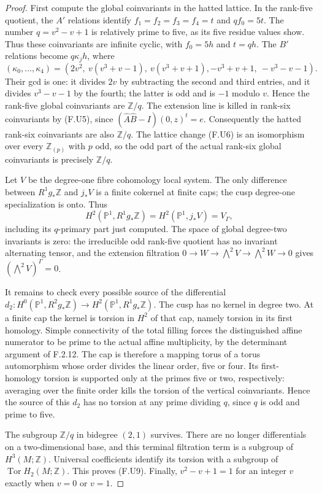\begin{proof}
First compute the global coinvariants in the hatted lattice.
In the rank-five quotient, the $A'$ relations identify
$f_1=f_2=f_3=f_4=t$ and $qf_0=5t$.
The number $q=v^2-v+1$ is relatively prime to five, as its
five residue values show.  Thus these coinvariants are
infinite cyclic, with $f_0=5h$ and $t=qh$.
The $B'$ relations become $q\kappa_j h$, where
\[
 (\kappa_0,\ldots,\kappa_4)=
 (2v^2,\ v(v^3+v-1),\ v(v^3+v+1),
       -v^3+v+1,\ -v^3-v-1).
 \tag{F.U10}
\]
Their gcd is one: it divides $2v$ by subtracting the second
and third entries, and it divides $v^3-v-1$ by the fourth;
the latter is odd and is $-1$ modulo $v$.
Hence the rank-five global coinvariants are $\mathbb Z/q$.
The extension line is killed in rank-six coinvariants by
(F.U5), since
$(\widehat A\widehat B-I)(0,z)^t=e$.
Consequently the hatted rank-six coinvariants are also
$\mathbb Z/q$.  The lattice change (F.U6) is an isomorphism
over every $\mathbb Z_{(p)}$ with $p$ odd, so the odd part of
the actual rank-six global coinvariants is precisely
$\mathbb Z/q$.

Let $V$ be the degree-one fibre cohomology local system.
The only difference between $R^1g_*\mathbb Z$ and $j_*V$
is a finite cokernel at finite caps; the cusp degree-one
specialization is onto.  Thus
\[
 H^2(\mathbb P^1,R^1g_*\mathbb Z)
 =H^2(\mathbb P^1,j_*V)=V_\Gamma,
\]
including its $q$-primary part just computed.  The space of
global degree-two invariants is zero: the irreducible odd
rank-five quotient has no invariant alternating tensor,
and the extension filtration
$0\to W\to\bigwedge^2V\to\bigwedge^2W\to0$
gives $(\bigwedge^2V)^\Gamma=0$.

It remains to check every possible source of the differential
$d_2:H^0(\mathbb P^1,R^2g_*\mathbb Z)
\to H^2(\mathbb P^1,R^1g_*\mathbb Z)$.
The cusp has no kernel in degree two.  At a finite cap the
kernel is torsion in $H^2$ of that cap, namely torsion in its
first homology.  Simple connectivity of the total filling
forces the distinguished affine numerator to be prime to the
actual affine multiplicity, by the determinant argument of
F.2.12.  The cap is therefore a mapping torus of a torus
automorphism whose order divides the linear order, five or
four.  Its first-homology torsion is supported only at the
primes five or two, respectively: averaging over the finite
order kills the torsion of the vertical coinvariants.
Hence the source of this $d_2$ has no torsion at any prime
dividing $q$, since $q$ is odd and prime to five.

The subgroup $\mathbb Z/q$ in bidegree $(2,1)$ survives.
There are no longer differentials on a two-dimensional base,
and this terminal filtration term is a subgroup of
$H^3(M;\mathbb Z)$.  Universal coefficients identify its
torsion with a subgroup of $\operatorname{Tor}H_2(M;\mathbb Z)$.
This proves (F.U9).  Finally, $v^2-v+1=1$ for an integer $v$
exactly when $v=0$ or $v=1$.
\end{proof}

